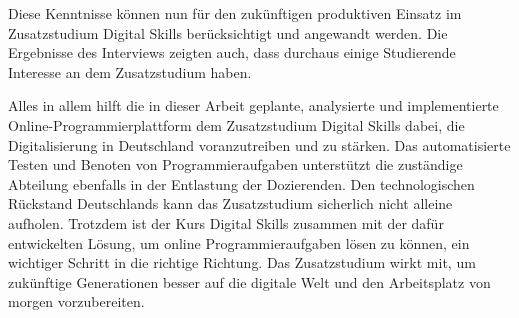 Diese Kenntnisse können nun für den zukünftigen produktiven Einsatz im
Zusatzstudium Digital Skills berücksichtigt und angewandt werden. Die Ergebnisse
des Interviews zeigten auch, dass durchaus einige Studierende Interesse an dem
Zusatzstudium haben.

\newpage

Alles in allem hilft die in dieser Arbeit geplante, analysierte und
implementierte Online-Programmierplattform dem Zusatzstudium Digital Skills
dabei, die Digitalisierung in Deutschland voranzutreiben und zu stärken. Das
automatisierte Testen und Benoten von Programmieraufgaben unterstützt die
zuständige Abteilung ebenfalls in der Entlastung der Dozierenden. Den
technologischen Rückstand Deutschlands kann das Zusatzstudium sicherlich nicht
alleine aufholen. Trotzdem ist der Kurs Digital Skills zusammen mit der
dafür entwickelten Lösung, um online Programmieraufgaben lösen zu können, ein
wichtiger Schritt in die richtige Richtung. Das Zusatzstudium wirkt mit, um
zukünftige Generationen besser auf die digitale Welt und den Arbeitsplatz von
morgen vorzubereiten.
